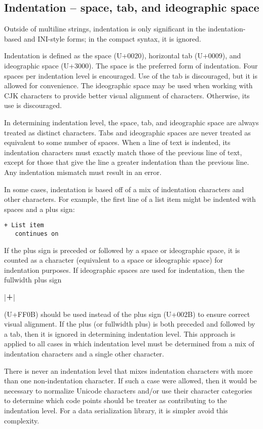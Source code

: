 \documentclass[11pt]{article}
\begin{document}
\subsection{Indentation -- space, tab, and ideographic space}

Outside of multiline strings, indentation is only significant in the indentation-based and INI-style forms; in the compact syntax, it is ignored.

Indentation is defined as the space (U+0020), horizontal tab (U+0009), and ideographic space (U+3000).  The space is the preferred form of indentation.  Four spaces per indentation level is encouraged.  Use of the tab is discouraged, but it is allowed for convenience.  The ideographic space may be used when working with CJK characters to provide better visual alignment of characters.  Otherwise, its use is discouraged.

In determining indentation level, the space, tab, and ideographic space are always treated as distinct characters.  Tabs and ideographic spaces are never treated as equivalent to some number of spaces.  When a line of text is indented, its indentation characters must exactly match those of the previous line of text, except for those that give the line a greater indentation than the previous line.  Any indentation mismatch must result in an error.

In some cases, indentation is based off of a mix of indentation characters and other characters.  For example, the first line of a list item might be indented with spaces and a plus sign:
\begin{Verbatim}[showspaces]
 + List item
   continues on
\end{Verbatim}
If the plus sign is preceded or followed by a space or ideographic space, it is counted as a character (equivalent to a space or ideographic space) for indentation purposes.  If ideographic spaces are used for indentation, then the fullwidth plus sign \begin{CJK*}{UTF8}{gkai}|＋|\end{CJK*} (U+FF0B) should be used instead of the plus sign (U+002B) to ensure correct visual alignment.  If the plus (or fullwidth plus) is both preceded and followed by a tab, then it is ignored in determining indentation level.  This approach is applied to all cases in which indentation level must be determined from a mix of indentation characters and a single other character.

There is never an indentation level that mixes indentation characters with more than one non-indentation character.  If such a case were allowed, then it would be necessary to normalize Unicode characters and/or use their character categories to determine which code points should be treater as contributing to the indentation level.  For a data serialization library, it is simpler avoid this complexity.
\end{document}
